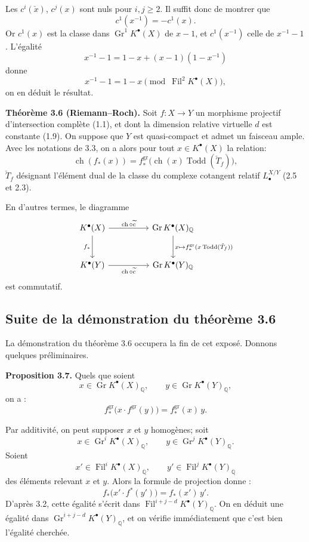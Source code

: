 \documentclass[11pt]{article}
\newcommand{\Gr}{\operatorname{Gr}}
\newcommand{\Fil}{\operatorname{Fil}}
\newcommand{\ch}{\operatorname{ch}}
\newcommand{\Todd}{\operatorname{Todd}}
\providecommand{\ch}{\operatorname{ch}}
\providecommand{\Todd}{\operatorname{Todd}}
\providecommand{\Gr}{\operatorname{Gr}}
\providecommand{\Gr}{\operatorname{G}}
\begin{document}
Les $c^i(\check x)$, $c^j(x)$ sont nuls pour $i,j\geq2$. Il suffit donc de montrer que
\[
c^1(x^{-1})=-c^1(x).
\]
Or $c^1(x)$ est la classe dans $\Gr^1K^{\bullet}(X)$ de $x-1$, et $c^1(x^{-1})$ celle de $x^{-1}-1$. L'égalité
\[
x^{-1}-1=1-x+(x-1)(1-x^{-1})
\]
donne
\[
x^{-1}-1=1-x\pmod{\Fil^2K^{\bullet}(X)},
\]
on en déduit le résultat.

\textbf{Théorème 3.6 (Riemann--Roch).} Soit $f:X\to Y$ un morphisme projectif d'intersection complète (1.1), et dont la dimension relative virtuelle $d$ est constante (1.9). On suppose que $Y$ est quasi-compact et admet un faisceau ample. Avec les notations de 3.3, on a alors pour tout $x\in K^{\bullet}(X)$ la relation:
\[
\ch(f_*(x))=f^{\mathrm{gr}}_*\bigl(\ch(x)\Todd(\check T_f)\bigr),
\]
$\check T_f$ désignant l'élément dual de la classe du complexe cotangent relatif $L^{X/Y}_\bullet$ (2.5 et 2.3).

En d'autres termes, le diagramme
\[
\begin{tikzcd}[column sep=huge,row sep=large]
K^{\bullet}(X) \arrow[r,"\ch\circ\widetilde c"] \arrow[d,"f_*"'] & \Gr K^{\bullet}(X)_{\mathbb Q} \arrow[d,"x\mapsto f^{\mathrm{gr}}_*(x\Todd(\check T_f))"]\\
K^{\bullet}(Y) \arrow[r,"\ch\circ\widetilde c"'] & \Gr K^{\bullet}(Y)_{\mathbb Q}
\end{tikzcd}
\]
est commutatif.



\subsection*{Suite de la démonstration du théorème 3.6}

La démonstration du théorème 3.6 occupera la fin de cet exposé. Donnons quelques préliminaires.

\textbf{Proposition 3.7.} Quels que soient
\[
x\in \Gr K^{\bullet}(X)_{\mathbb Q},\qquad
y\in \Gr K^{\bullet}(Y)_{\mathbb Q},
\]
on a :
\[
 f^{\mathrm{gr}}_*\bigl(x\cdot f^{\mathrm{gr}}(y)\bigr)
 =
 f^{\mathrm{gr}}_*(x)\,y .
\]

Par additivité, on peut supposer \(x\) et \(y\) homogènes; soit
\[
x\in \Gr^iK^{\bullet}(X)_{\mathbb Q},\qquad
y\in \Gr^jK^{\bullet}(Y)_{\mathbb Q}.
\]
Soient
\[
x'\in \Fil^iK^{\bullet}(X)_{\mathbb Q},\qquad
y'\in \Fil^jK^{\bullet}(Y)_{\mathbb Q}
\]
des éléments relevant \(x\) et \(y\). Alors la formule de projection donne :
\[
 f_*\bigl(x'\cdot f^*(y')\bigr)=f_*(x')\,y'.
\]
D'après 3.2, cette égalité s'écrit dans
\(\Fil^{i+j-d}K^{\bullet}(Y)_{\mathbb Q}\). On en déduit une égalité dans
\(\Gr^{i+j-d}K^{\bullet}(Y)_{\mathbb Q}\), et on vérifie immédiatement que c'est bien l'égalité cherchée.
\end{document}
